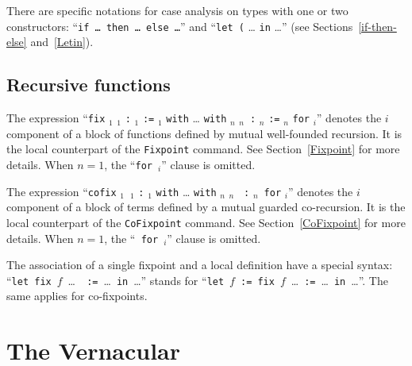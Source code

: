 There are specific notations for case analysis on types with one or
two constructors: ``{\tt if {\ldots} then {\ldots} else {\ldots}}''
and ``{\tt let (}\nelist{\ldots}{,}{\tt ) := } {\ldots} {\tt in}
{\ldots}'' (see Sections~\ref{if-then-else} and~\ref{Letin}).


\subsection{Recursive functions
\label{fixpoints}
}

The expression ``{\tt fix} \ident$_1$ \binder$_1$ {\tt :} {\type$_1$}
\texttt{:=} \term$_1$ {\tt with} {\ldots} {\tt with} \ident$_n$
\binder$_n$~{\tt :} {\type$_n$} \texttt{:=} \term$_n$ {\tt for}
{\ident$_i$}'' denotes the $i$\nth component of a block of functions
defined by mutual well-founded recursion. It is the local counterpart
of the {\tt Fixpoint} command. See Section~\ref{Fixpoint} for more
details. When $n=1$, the ``{\tt for}~{\ident$_i$}'' clause is omitted.

The expression ``{\tt cofix} \ident$_1$~\binder$_1$ {\tt :}
{\type$_1$} {\tt with} {\ldots} {\tt with} \ident$_n$ \binder$_n$ {\tt
:} {\type$_n$}~{\tt for} {\ident$_i$}'' denotes the $i$\nth component of
a block of terms defined by a mutual guarded co-recursion. It is the
local counterpart of the {\tt CoFixpoint} command. See
Section~\ref{CoFixpoint} for more details. When $n=1$, the ``{\tt
for}~{\ident$_i$}'' clause is omitted.

The association of a single fixpoint and a local
definition have a special syntax: ``{\tt let fix}~$f$~{\ldots}~{\tt
  :=}~{\ldots}~{\tt in}~{\ldots}'' stands for ``{\tt let}~$f$~{\tt :=
  fix}~$f$~\ldots~{\tt :=}~{\ldots}~{\tt in}~{\ldots}''. The same
  applies for co-fixpoints.


\section{The Vernacular
\label{Vernacular}}

